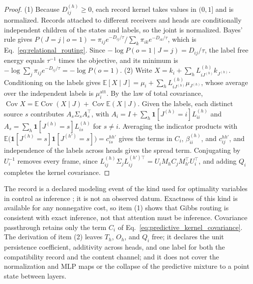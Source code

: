 \documentclass[twoside,11pt]{article}
\begin{document}
\begin{proof}
(1) Because $D_{ij}^{(h)}\ge0$, each record kernel takes values in $(0,1]$ and is normalized. Records attached to different receivers and heads are conditionally independent children of the states and labels, so the joint is normalized. Bayes' rule gives $P(J=j\mid o=1)=\pi_{ij}e^{-D_{ij}/\tau}/\sum_k\pi_{ik}e^{-D_{ik}/\tau}$, which is Eq.~\eqref{eq:relational_routing}. Since $-\log P(o=1\mid J=j)=D_{ij}/\tau$, the label free energy equals $\tau^{-1}$ times the objective, and its minimum is $-\log\sum_j\pi_{ij}e^{-D_{ij}/\tau}=-\log P(o=1)$.
(2) Write $X=k_i+\sum_hL_{iJ^{(h)}}^{(h)}k_{J^{(h)}}$. Conditioning on the labels gives $\mathbb E[X\mid J]=\mu_i+\sum_hL^{(h)}_{iJ^{(h)}}\mu_{J^{(h)}}$, whose average over the independent labels is $\mu_i^{\mathrm{att}}$. By the law of total covariance, $\operatorname{Cov}X=\mathbb E\operatorname{Cov}(X\mid J)+\operatorname{Cov}\mathbb E(X\mid J)$. Given the labels, each distinct source $s$ contributes $A_s\Sigma_sA_s^\top$, with $A_i=I+\sum_h\mathbf 1[J^{(h)}=i]L_{ii}^{(h)}$ and $A_s=\sum_h\mathbf 1[J^{(h)}=s]L_{is}^{(h)}$ for $s\ne i$. Averaging the indicator products with $\mathbb E\bigl(\mathbf 1[J^{(h)}=s]\mathbf 1[J^{(h')}=s]\bigr)=c_{is}^{hh'}$ gives the terms in $C_i$, $\beta_{ii}^{(h)}$, and $c_{ij}^{hh'}$, and independence of the labels across heads gives the spread term. Conjugating by $U_i^{-1}$ removes every frame, since $L_{ij}^{(h)}\Sigma_jL_{ij}^{(h')\top}=U_iM_hC_jM_{h'}^\top U_i^\top$, and adding $Q_i$ completes the kernel covariance.
\end{proof}
The record is a declared modeling event of the kind used for optimality variables in control as inference \citep{ToussaintStorkey2006,Kappen2012,Levine2018}; it is not an observed datum. Exactness of this kind is available for any nonnegative cost, so item (1) shows that Gibbs routing is consistent with exact inference, not that attention must be inference. Covariance passthrough retains only the term $C_i$ of Eq.~\eqref{eq:predictive_kernel_covariance}. The derivation of item (2) leaves $T_h$, $O_h$, and $Q_i$ free; it declares the unit persistence coefficient, additivity across heads, and one label for both the compatibility record and the content channel; and it does not cover the normalization and MLP maps or the collapse of the predictive mixture to a point state between layers.
\end{document}
